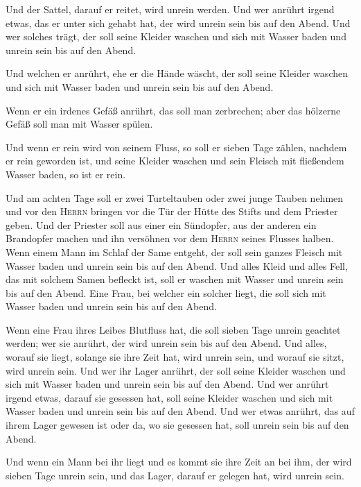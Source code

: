  Und der Sattel, darauf er reitet, wird unrein werden.
 Und wer anrührt irgend etwas, das er unter sich gehabt
hat, der wird unrein sein bis auf den Abend. Und wer solches trägt, der
soll seine Kleider waschen und sich mit Wasser baden und unrein sein bis
auf den Abend.

 Und welchen er anrührt, ehe er die Hände wäscht, der
soll seine Kleider waschen und sich mit Wasser baden und unrein sein bis
auf den Abend.

 Wenn er ein irdenes Gefäß anrührt, das soll man
zerbrechen; aber das hölzerne Gefäß soll man mit Wasser spülen.

 Und wenn er rein wird von seinem Fluss, so soll er
sieben Tage zählen, nachdem er rein geworden ist, und seine Kleider
waschen und sein Fleisch mit fließendem Wasser baden, so ist er rein.

 Und am achten Tage soll er zwei Turteltauben oder zwei
junge Tauben nehmen und vor den \textsc{Herrn} bringen vor die Tür der
Hütte des Stifts und dem Priester geben.  Und der
Priester soll aus einer ein Sündopfer, aus der anderen ein Brandopfer
machen und ihn versöhnen vor dem \textsc{Herrn} seines Flusses halben.
 Wenn einem Mann im Schlaf der Same entgeht, der soll
sein ganzes Fleisch mit Wasser baden und unrein sein bis auf den Abend.
 Und alles Kleid und alles Fell, das mit solchem Samen
befleckt ist, soll er waschen mit Wasser und unrein sein bis auf den
Abend.  Eine Frau, bei welcher ein solcher liegt, die
soll sich mit Wasser baden und unrein sein bis auf den Abend.

 Wenn eine Frau ihres Leibes Blutfluss hat, die soll
sieben Tage unrein geachtet werden; wer sie anrührt, der wird unrein
sein bis auf den Abend.  Und alles, worauf sie liegt,
solange sie ihre Zeit hat, wird unrein sein, und worauf sie sitzt, wird
unrein sein.  Und wer ihr Lager anrührt, der soll seine
Kleider waschen und sich mit Wasser baden und unrein sein bis auf den
Abend.  Und wer anrührt irgend etwas, darauf sie gesessen
hat, soll seine Kleider waschen und sich mit Wasser baden und unrein
sein bis auf den Abend.  Und wer etwas anrührt, das auf
ihrem Lager gewesen ist oder da, wo sie gesessen hat, soll unrein sein
bis auf den Abend.

 Und wenn ein Mann bei ihr liegt und es kommt sie ihre
Zeit an bei ihm, der wird sieben Tage unrein sein, und das Lager, darauf
er gelegen hat, wird unrein sein.

